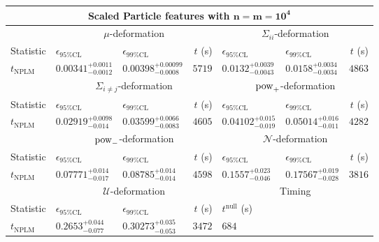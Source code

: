 \begin{tabular}{l|llr|llr}
	\toprule
	\multicolumn{7}{c}{{\bf Scaled Particle features with $\mathbf{n=m=10^{4}}$}} \\
	\toprule
	\multicolumn{1}{c}{} & \multicolumn{3}{c}{$\mu$-deformation} & \multicolumn{3}{c}{$\Sigma_{ii}$-deformation} \\
	Statistic & $\epsilon_{95\%\mathrm{CL}}$ & $\epsilon_{99\%\mathrm{CL}}$ & $t$ (s) & $\epsilon_{95\%\mathrm{CL}}$ & $\epsilon_{99\%\mathrm{CL}}$ & $t$ (s) \\
	\midrule
	$t_{\mathrm{NPLM}}$ & $0.00341_{-0.0012}^{+0.0011}$ & $0.00398_{-0.0008}^{+0.00099}$ & $5719$ & $0.0132_{-0.0043}^{+0.0039}$ & $0.0158_{-0.0034}^{+0.0034}$ & $4863$ \\
	\toprule
	\multicolumn{1}{c}{} & \multicolumn{3}{c}{$\Sigma_{i\neq j}$-deformation} & \multicolumn{3}{c}{$\rm{pow}_{+}$-deformation} \\
	Statistic & $\epsilon_{95\%\mathrm{CL}}$ & $\epsilon_{99\%\mathrm{CL}}$ & $t$ (s) & $\epsilon_{95\%\mathrm{CL}}$ & $\epsilon_{99\%\mathrm{CL}}$ & $t$ (s) \\
	\midrule
	$t_{\mathrm{NPLM}}$ & $0.02919_{-0.014}^{+0.0098}$ & $0.03599_{-0.0083}^{+0.0066}$ & $4605$ & $0.04102_{-0.019}^{+0.015}$ & $0.05014_{-0.011}^{+0.016}$ & $4282$ \\
	\toprule
	\multicolumn{1}{c}{} & \multicolumn{3}{c}{$\rm{pow}_{-}$-deformation} & \multicolumn{3}{c}{$\mathcal{N}$-deformation} \\
	Statistic & $\epsilon_{95\%\mathrm{CL}}$ & $\epsilon_{99\%\mathrm{CL}}$ & $t$ (s) & $\epsilon_{95\%\mathrm{CL}}$ & $\epsilon_{99\%\mathrm{CL}}$ & $t$ (s) \\
	\midrule
	$t_{\mathrm{NPLM}}$ & $0.07771_{-0.017}^{+0.014}$ & $0.08785_{-0.014}^{+0.014}$ & $4598$ & $0.1557_{-0.046}^{+0.023}$ & $0.17567_{-0.028}^{+0.019}$ & $3816$ \\
	\toprule
	\multicolumn{1}{c}{} & \multicolumn{3}{c}{$\mathcal{U}$-deformation} & \multicolumn{3}{c}{Timing} \\
	Statistic & $\epsilon_{95\%\mathrm{CL}}$ & $\epsilon_{99\%\mathrm{CL}}$ & $t$ (s) & $t^{\mathrm{null}}$ (s) \\
	\midrule
	$t_{\mathrm{NPLM}}$ & $0.2653_{-0.077}^{+0.044}$ & $0.30273_{-0.053}^{+0.035}$ & $3472$ & $684$ \\
	\bottomrule
\end{tabular}